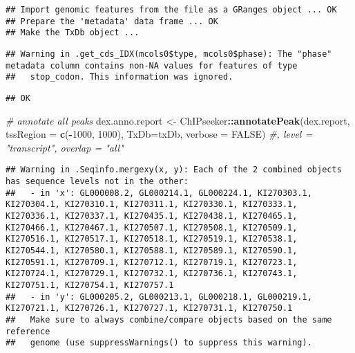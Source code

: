 \documentclass[
]{article}
\newenvironment{Shaded}{\begin{snugshade}}{\end{snugshade}}
\newcommand{\CommentTok}[1]{\textcolor[rgb]{0.56,0.35,0.01}{\textit{#1}}}
\newcommand{\DataTypeTok}[1]{\textcolor[rgb]{0.13,0.29,0.53}{#1}}
\newcommand{\DecValTok}[1]{\textcolor[rgb]{0.00,0.00,0.81}{#1}}
\newcommand{\KeywordTok}[1]{\textcolor[rgb]{0.13,0.29,0.53}{\textbf{#1}}}
\newcommand{\NormalTok}[1]{#1}
\newcommand{\OperatorTok}[1]{\textcolor[rgb]{0.81,0.36,0.00}{\textbf{#1}}}
\newcommand{\OtherTok}[1]{\textcolor[rgb]{0.56,0.35,0.01}{#1}}
\newcommand{\StringTok}[1]{\textcolor[rgb]{0.31,0.60,0.02}{#1}}
\begin{document}
\begin{verbatim}
## Import genomic features from the file as a GRanges object ... OK
## Prepare the 'metadata' data frame ... OK
## Make the TxDb object ...
\end{verbatim}

\begin{verbatim}
## Warning in .get_cds_IDX(mcols0$type, mcols0$phase): The "phase" metadata column contains non-NA values for features of type
##   stop_codon. This information was ignored.
\end{verbatim}

\begin{verbatim}
## OK
\end{verbatim}

\begin{Shaded}
\begin{Highlighting}[]
\CommentTok{# annotate all peaks}
\NormalTok{dex.anno.report <-}\StringTok{ }\NormalTok{ChIPseeker}\OperatorTok{::}\KeywordTok{annotatePeak}\NormalTok{(dex.report, }\DataTypeTok{tssRegion =} \KeywordTok{c}\NormalTok{(}\OperatorTok{-}\DecValTok{1000}\NormalTok{, }\DecValTok{1000}\NormalTok{), }\DataTypeTok{TxDb=}\NormalTok{txDb, }\DataTypeTok{verbose =} \OtherTok{FALSE}\NormalTok{) }\CommentTok{#, level = "transcript", overlap = "all" }
\end{Highlighting}
\end{Shaded}

\begin{verbatim}
## Warning in .Seqinfo.mergexy(x, y): Each of the 2 combined objects has sequence levels not in the other:
##   - in 'x': GL000008.2, GL000214.1, GL000224.1, KI270303.1, KI270304.1, KI270310.1, KI270311.1, KI270330.1, KI270333.1, KI270336.1, KI270337.1, KI270435.1, KI270438.1, KI270465.1, KI270466.1, KI270467.1, KI270507.1, KI270508.1, KI270509.1, KI270516.1, KI270517.1, KI270518.1, KI270519.1, KI270538.1, KI270544.1, KI270580.1, KI270588.1, KI270589.1, KI270590.1, KI270591.1, KI270709.1, KI270712.1, KI270719.1, KI270723.1, KI270724.1, KI270729.1, KI270732.1, KI270736.1, KI270743.1, KI270751.1, KI270754.1, KI270757.1
##   - in 'y': GL000205.2, GL000213.1, GL000218.1, GL000219.1, KI270721.1, KI270726.1, KI270727.1, KI270731.1, KI270750.1
##   Make sure to always combine/compare objects based on the same reference
##   genome (use suppressWarnings() to suppress this warning).
\end{verbatim}
\end{document}
